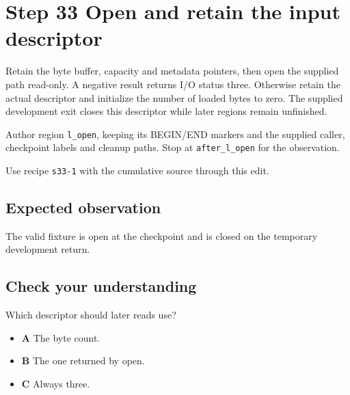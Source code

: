 \section{Step 33 Open and retain the input descriptor}\label{ppm-s33}

Retain the byte buffer, capacity and metadata pointers, then open the supplied path read-only. A negative result returns I/O status three. Otherwise retain the actual descriptor and initialize the number of loaded bytes to zero. The supplied development exit closes this descriptor while later regions remain unfinished.

Author region \texttt{l\_open}, keeping its BEGIN/END markers and the supplied caller, checkpoint labels and cleanup paths. Stop at \texttt{after\_l\_open} for the observation.

Use recipe \texttt{s33-1} with the cumulative source through this edit.

\subsection{Expected observation}
The valid fixture is open at the checkpoint and is closed on the temporary development return.

\subsection{Check your understanding}
Which descriptor should later reads use?

\begin{itemize}
  \item \textbf{A} The byte count.
  \item \textbf{B} The one returned by open.
  \item \textbf{C} Always three.
\end{itemize}
